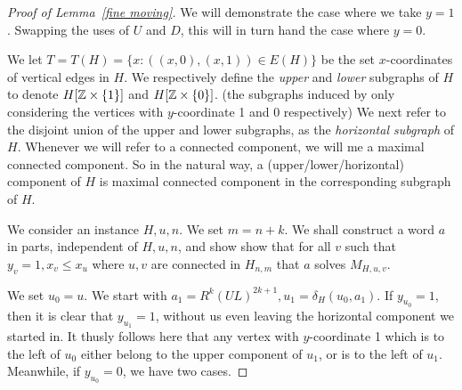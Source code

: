 \documentclass[a4paper]{article}
\theoremstyle{definition}
\begin{document}
\begin{proof}[Proof of Lemma~\ref*{fine moving}]
    We will demonstrate the case where we take $y = 1$. Swapping the uses of $U$ and $D$, this will in turn hand the case where $y=0$.
    
    We let $T= T(H) = \{x: ((x,0),(x,1)) \in E(H)\}$ be the set $x$-coordinates of vertical edges in $H$. We respectively define the \textit{upper} and \textit{lower} subgraphs of $H$ to denote $H[\Bbb{Z}\times \{1\}]$ and $H[\Bbb{Z}\times \{0\}]$. (the subgraphs induced by only considering the vertices with $y$-coordinate 1 and 0 respectively) We next refer to the disjoint union of the upper and lower subgraphs, as the \textit{horizontal subgraph} of $H$. Whenever we will refer to a connected component, we will me a maximal connected component. So in the natural way, a (upper/lower/horizontal) component of $H$ is maximal connected component in the corresponding subgraph of $H$.
    
    We consider an instance $H,u,n$. We set $m=n+k$. We shall construct a word $a$ in parts, independent of $H,u,n$, and show show that for all $v$ such that $y_v = 1, x_v\le x_u$ where $u,v$ are connected in $H_{n,m}$ that $a$ solves $M_{H,u,v}$.
    
    We set $u_0 = u$. We start with $a_1 = R^k(UL)^{2k+1}, u_1 = \delta_H(u_0,a_1)$. If $y_{u_0}= 1$, then it is clear that $y_{u_1} = 1$, without us even leaving the horizontal component we started in. It thusly follows here that any vertex with $y$-coordinate 1 which is to the left of $u_0$ either belong to the upper component of $u_1$, or is to the left of $u_1$. Meanwhile, if $y_{u_0} = 0$, we have two cases. 
    

\end{proof}
\end{document}
